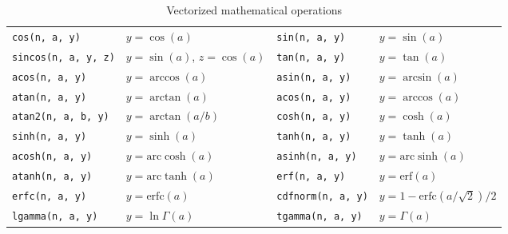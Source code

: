 \documentclass[11pt,bib,mint,hyper,altcolor]{marticle}
\begin{document}
\begin{table}[t]
\begin{tabu}{X[l]X[l]X[l]X[l]}
    \texttt{cos(n, a, y)}       & $y = \cos(a)$                             &
    \texttt{sin(n, a, y)}       & $y = \sin(a)$                             \\
    \texttt{sincos(n, a, y, z)} & $y = \sin(a)$, $z = \cos(a)$              &
    \texttt{tan(n, a, y)}       & $y = \tan(a)$                             \\
    \texttt{acos(n, a, y)}      & $y = \arccos(a)$                          &
    \texttt{asin(n, a, y)}      & $y = \arcsin(a)$                          \\
    \texttt{atan(n, a, y)}      & $y = \arctan(a)$                          &
    \texttt{acos(n, a, y)}      & $y = \arccos(a)$                          \\
    \texttt{atan2(n, a, b, y)}  & $y = \arctan(a / b)$                      &
    \texttt{cosh(n, a, y)}      & $y = \cosh(a)$                            \\
    \texttt{sinh(n, a, y)}      & $y = \sinh(a)$                            &
    \texttt{tanh(n, a, y)}      & $y = \tanh(a)$                            \\
    \texttt{acosh(n, a, y)}     & $y = \mathrm{arc}\cosh(a)$                &
    \texttt{asinh(n, a, y)}     & $y = \mathrm{arc}\sinh(a)$                \\
    \texttt{atanh(n, a, y)}     & $y = \mathrm{arc}\tanh(a)$                &
    \texttt{erf(n, a, y)}       & $y = \mathrm{erf}(a)$                     \\
    \texttt{erfc(n, a, y)}      & $y = \mathrm{erfc}(a)$                    &
    \texttt{cdfnorm(n, a, y)}   & $y = 1 - \mathrm{erfc}(a / \sqrt{2}) / 2$ \\
    \texttt{lgamma(n, a, y)}    & $y = \ln\Gamma(a)$                        &
    \texttt{tgamma(n, a, y)}    & $y = \Gamma(a)$                           \\
    \bottomrule
  \end{tabu}
  \caption{Vectorized mathematical operations}
  \label{tab:Vectorized mathematical operations}
\end{table}
\end{document}
